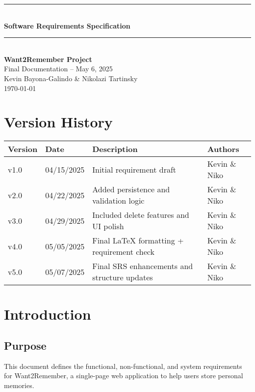 \documentclass[12pt]{article}
\begin{document}
\begin{titlepage}
    \newcommand{\HRule}{\rule{\linewidth}{0.5mm}} 
    \vspace*{\fill}
    \begin{center}
        \HRule \\[0.5cm]
        {\Huge \bfseries Software Requirements Specification \\[0.4cm]}
        \HRule \\[1.5cm]
        {\LARGE \textbf{Want2Remember Project}}\\[0.5cm]
        {\Large Final Documentation – May 6, 2025}\\[2cm]
        {\Large Kevin Bayona-Galindo \& Nikolazi Tartinsky}\\[0.5cm]
        {\large \today}
    \end{center}
    \vspace*{\fill}
\end{titlepage}

\tableofcontents
\newpage

\section*{Version History}
\begin{longtable}{|p{3cm}|p{3cm}|p{6cm}|p{4cm}|}
\hline
\textbf{Version} & \textbf{Date} & \textbf{Description} & \textbf{Authors} \\
\hline
v1.0 & 04/15/2025 & Initial requirement draft & Kevin \& Niko \\
\hline
v2.0 & 04/22/2025 & Added persistence and validation logic & Kevin \& Niko \\
\hline
v3.0 & 04/29/2025 & Included delete features and UI polish & Kevin \& Niko \\
\hline
v4.0 & 05/05/2025 & Final LaTeX formatting + requirement check & Kevin \& Niko \\
\hline
v5.0 & 05/07/2025 & Final SRS enhancements and structure updates & Kevin \& Niko \\
\hline
\end{longtable}

\section{Introduction}
\subsection*{Purpose}
This document defines the functional, non-functional, and system requirements for Want2Remember, a single-page web application to help users store personal memories.
\end{document}
